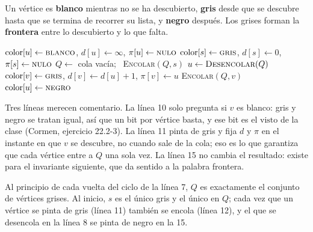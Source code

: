 \documentclass[11pt,letterpaper]{article}
\begin{document}
\begin{definicion}
  Un vértice es \textbf{blanco} mientras no se ha descubierto,
  \textbf{gris} desde que se descubre hasta que se termina de recorrer
  su lista, y \textbf{negro} después. Los grises forman la
  \textbf{frontera} entre lo descubierto y lo que falta.
\end{definicion}

\begin{algorithm}[H]
\caption{\textsc{BFS}$(G, s)$ con colores (Cormen, sección 22.2)}
\label{alg:bfs-colores}
\begin{algorithmic}[1]
    \State $\text{color}[u] \gets \textsc{blanco}$, \quad
           $d[u] \gets \infty$, \quad $\pi[u] \gets \textsc{nulo}$
  \EndFor
  \State $\text{color}[s] \gets \textsc{gris}$, \quad $d[s] \gets 0$,
         \quad $\pi[s] \gets \textsc{nulo}$
  \State $Q \gets$ cola vacía; \ \textsc{Encolar}$(Q, s)$
    \State $u \gets \textsc{Desencolar}(Q)$
       
        \State $\text{color}[v] \gets \textsc{gris}$, \quad
               $d[v] \gets d[u] + 1$, \quad $\pi[v] \gets u$
        \State \textsc{Encolar}$(Q, v)$
      \EndIf
    \EndFor
    \State $\text{color}[u] \gets \textsc{negro}$
  \EndWhile
\EndProcedure
\end{algorithmic}
\end{algorithm}

Tres líneas merecen comentario. La línea 10 solo pregunta si $v$ es
blanco: gris y negro se tratan igual, así que un bit por vértice
basta, y ese bit es el $\text{visto}$ de la clase (Cormen, ejercicio
22.2-3). La línea 11 pinta de gris y fija $d$ y $\pi$ en el instante
en que $v$ se descubre, no cuando sale de la cola; eso es lo que
garantiza que cada vértice entre a $Q$ una sola vez. La línea 15 no
cambia el resultado: existe para el invariante siguiente, que da
sentido a la palabra frontera.

\begin{observacion}
  Al principio de cada vuelta del ciclo de la línea 7, $Q$ es
  exactamente el conjunto de vértices grises. Al inicio, $s$ es el
  único gris y el único en $Q$; cada vez que un vértice se pinta de
  gris (línea 11) también se encola (línea 12), y el que se desencola
  en la línea 8 se pinta de negro en la 15.
\end{observacion}
\end{document}
